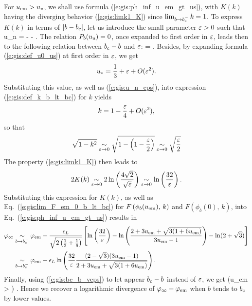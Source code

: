 For $u_{\rm em} > u_*$, we shall use formula (\ref{e:gis:ph_inf_u_em_gt_us}), with
$K(k)$ having the diverging behavior (\ref{e:gis:limk1_K})
since $\lim_{b\to b_{\rm c}^-} k = 1$. To express $K(k)$ in terms of
$|b - b_{\rm c}|$, let us introduce the small parameter $\varepsilon > 0$ such that
\be \label{e:gis:u_n_eps}
    u_{\rm n} = -  - \veps.
\ee
The relation $P_b(u_{\rm n}) = 0$, once expanded to first order in $\varepsilon$,
leads then to the following relation between $b_{\rm c} - b$ and $\varepsilon$:
\be \label{e:gis:bc_b_veps}
     =  \veps.
\ee
Besides, by expanding formula (\ref{e:gis:def_u0_us}) at first order in $\varepsilon$,
we get
\[
    u_* = \frac{1}{3} + \varepsilon + O(\varepsilon^2) .
\]
Substituting this value, as well as (\ref{e:gis:u_n_eps}), into expression
(\ref{e:gis:def_k_b_lt_bc}) for $k$ yields
\[
    k = 1 - \frac{\varepsilon}{4} + O(\varepsilon^2) ,
\]
so that
\[
    \sqrt{1 - k^2} \underset{\varepsilon\to 0}{\sim} \sqrt{1 - \left(1 - \frac{\varepsilon}{2}\right)}
     \underset{\varepsilon\to 0}{\sim} \sqrt{\frac{\varepsilon}{2}}
\]
The property (\ref{e:gis:limk1_K}) then leads to
\[
    2 K(k) \underset{\varepsilon\to 0}{\sim} 2 \ln\left(\frac{4\sqrt{2}}{\sqrt{\varepsilon}}\right)
       \underset{\varepsilon\to 0}{\sim} \ln\left(\frac{32}{\varepsilon}\right)  .
\]
Substituting this expression for $K(k)$, as well as Eq.~(\ref{e:gis:lim_F_em_0_b_lt_bc})
for $F \left( \phi_b(u_{\rm em}),\, k \right)$ and $F \left( \phi_b(0),\, k \right)$,
into Eq.~(\ref{e:gis:ph_inf_u_em_gt_us}) results in
\begin{align}
\varphi_\infty & \underset{b\to b_{\rm c}^-}{\sim} \varphi_{\rm em}
    + \frac{\epsilon_L}{\sqrt{2\left(\frac{1}{3} + \frac{1}{6}\right)}} \left[
  \ln\left(\frac{32}{\varepsilon}\right)
    -  \ln \left(
      \frac{2 + 3 u_{\rm em} + \sqrt{3(1+6 u_{\rm em})}}{3 u_{\rm em} - 1}
      \right)
    - \ln(2 + \sqrt{3}) \right] \nonumber \\
 & \underset{b\to b_{\rm c}^-}{\sim} \varphi_{\rm em}
 + \epsilon_L \ln \left( \frac{32}{\varepsilon}
 \frac{(2 - \sqrt{3})(3 u_{\rm em} - 1)}{2 + 3 u_{\rm em} + \sqrt{3(1 + 6 u_{\rm em})}}
 \right) . \nonumber
\end{align}
Finally, using (\ref{e:gis:bc_b_veps}) to let appear $b_{\rm c} - b$
instead of $\varepsilon$, we get
\be \label{e:gis:ph_inf_lim_b_lt_bc_u_gt_us}
  \qquad \left(u_{\rm em} >  \right) .
\ee
Hence we recover a logarithmic divergence of $\varphi_\infty - \varphi_{\rm em}$
when $b$ tends to $b_{\rm c}$ by lower values.

